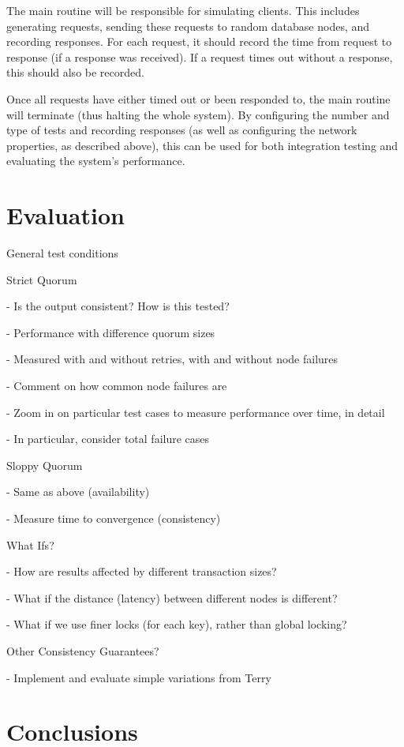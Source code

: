 \documentclass[12pt,a4paper,twoside,openright]{report}
\begin{document}
The main routine will be responsible for simulating clients. This includes generating requests, sending these requests to random database nodes, and recording responses. For each request, it should record the time from request to response (if a response was received). If a request times out without a response, this should also be recorded.

Once all requests have either timed out or been responded to, the main routine will terminate (thus halting the whole system). By configuring the number and type of tests and recording responses (as well as configuring the network properties, as described above), this can be used for both integration testing and evaluating the system's performance.


\chapter{Evaluation}

General test conditions \cite{nunemaker}

Strict Quorum

- Is the output consistent? How is this tested?

- Performance with difference quorum sizes

- Measured with and without retries, with and without node failures

- Comment on how common node failures are \cite{45855}

- Zoom in on particular test cases to measure performance over time, in detail

- In particular, consider total failure cases

Sloppy Quorum

- Same as above (availability)

- Measure time to convergence (consistency)

What Ifs?

- How are results affected by different transaction sizes?

- What if the distance (latency) between different nodes is different?

- What if we use finer locks (for each key), rather than global locking?

Other Consistency Guarantees?

- Implement and evaluate simple variations from Terry \cite{terry2013}

\chapter{Conclusions}
\end{document}
